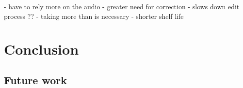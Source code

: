 - have to rely more on the audio
- greater need for correction
- slows down edit process ??
- taking more than is necessary
- shorter shelf life





\section{Conclusion}\label{sec:paper-conclusion}

\subsection{Future work}
